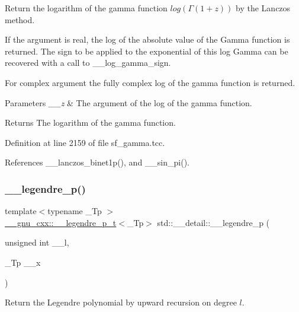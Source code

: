 Return the logarithm of the gamma function $ log(\Gamma(1+z)) $ by the Lanczos method. 

If the argument is real, the log of the absolute value of the Gamma function is returned. The sign to be applied to the exponential of this log Gamma can be recovered with a call to \+\_\+\+\_\+log\+\_\+gamma\+\_\+sign.

For complex argument the fully complex log of the gamma function is returned.


\begin{DoxyParams}{Parameters}
{\em \+\_\+\+\_\+z} & The argument of the log of the gamma function. \\
\hline
\end{DoxyParams}
\begin{DoxyReturn}{Returns}
The logarithm of the gamma function. 
\end{DoxyReturn}


Definition at line 2159 of file sf\+\_\+gamma.\+tcc.



References \+\_\+\+\_\+lanczos\+\_\+binet1p(), and \+\_\+\+\_\+sin\+\_\+pi().

\mbox{\label{namespacestd_1_1____detail_ab06b50bbac9758b5a2cc7d3d8213daa9}} 
\subsubsection{\texorpdfstring{\+\_\+\+\_\+legendre\+\_\+p()}{\_\_legendre\_p()}}
{\footnotesize\ttfamily template$<$typename \+\_\+\+Tp $>$ \\
\hyperlink{struct____gnu__cxx_1_1____legendre__p__t}{\+\_\+\+\_\+gnu\+\_\+cxx\+::\+\_\+\+\_\+legendre\+\_\+p\+\_\+t}$<$\+\_\+\+Tp$>$ std\+::\+\_\+\+\_\+detail\+::\+\_\+\+\_\+legendre\+\_\+p (\begin{DoxyParamCaption}\item[{unsigned int}]{\+\_\+\+\_\+l,  }\item[{\+\_\+\+Tp}]{\+\_\+\+\_\+x }\end{DoxyParamCaption})}



Return the Legendre polynomial by upward recursion on degree $ l $. 

